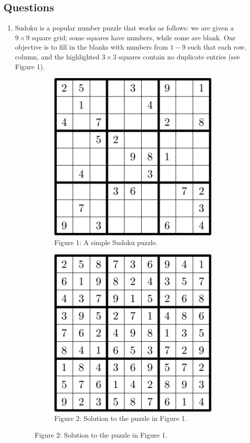 \subsection*{Questions}

\begin{enumerate}
    \item Sudoku is a popular number puzzle that works as follows: we are given a $9 \times 9$ square grid; some squares have numbers, while some are blank. Our objective is to fill in the blanks with numbers from $1 - 9$ such that each row, column, and the highlighted $3 \times 3$ squares contain no duplicate entries (see Figure 1).
    
    \begin{figure}[ht!]
        \centering
        
        \begin{subfigure}[t]{0.45\linewidth}
            \centering
            \includegraphics[width=0.5\linewidth]{figures/tut1-fig1.png}
            \caption*{Figure 1: A simple Sudoku puzzle.}
        \end{subfigure}
        \begin{subfigure}[t]{0.45\linewidth}
            \centering
            \includegraphics[width=0.5\linewidth]{figures/tut1-fig2.png}
            \caption*{Figure 2: Solution to the puzzle in Figure 1.}
        \end{subfigure}
    \end{figure}


\end{enumerate}

